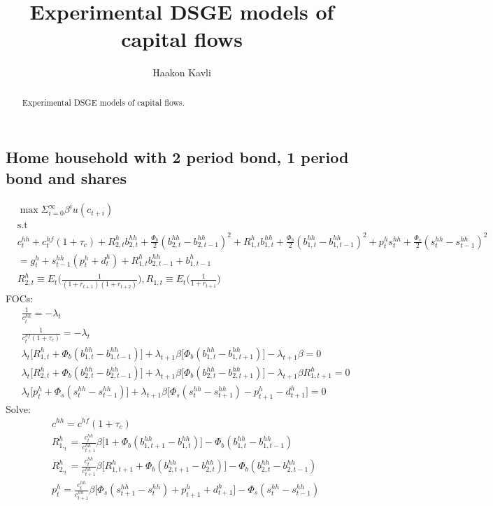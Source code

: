 \documentclass[a4paper]{article}
\begin{document}
\title{Experimental DSGE models of capital flows}
\author{Haakon Kavli}
\maketitle
\begin{abstract}
Experimental DSGE models of capital flows. 
\end{abstract}
\subsection{Home household with 2 period bond, 1 period bond and shares}
\begin{align*}
&\max \Sigma_{i=0}^\infty \beta^i u(c_{t+i})\\ &\text{s.t}\\
&c^{hh}_t+c^{hf}_t(1+\tau_c)+R^h_{2,t} b^{hh}_{2,t} + \frac{\Phi_b}{2}(b^{hh}_{2,t}-b^{hh}_{2,t-1})^2 +
R^h_{1,t} b^{hh}_{1,t} + \frac{\Phi_b}{2}(b^{hh}_{1,t}-b^{hh}_{1,t-1})^2 + p^{h}_t s^{hh}_t+\frac{\Phi_s}{2}(s^{hh}_t-s^{hh}_{t-1})^2\\
&=g^h_t+s^{hh}_{t-1}(p^{h}_t+d^{h}_t)+R^{h}_{1,t}b^{hh}_{2,t-1}+b^h_{1,t-1}\\
&R^h_{2,t} \equiv E_t\bigg(\frac{1}{(1+r_{t+1})(1+r_{t+2})} \bigg), R_{1,t} \equiv E_t\bigg(\frac{1}{1+r_{t+1}} \bigg)
\end{align*}
FOCs:
\begin{align*}
&\frac{1}{c^{hh}_t}=-\lambda_t\\
&\frac{1}{c^{hf}_t(1+\tau_c)}=-\lambda_t \\
&\lambda_t\big[R^h_{1,t}+\Phi_b (b^{hh}_{1,t}-b^{hh}_{1,t-1})\big ]+ \lambda_{t+1} \beta \big[\Phi_b (b^{hh}_{1,t} - b^{hh}_{1,t+1})]-\lambda_{t+1}\beta =0\\
&\lambda_t\big[R^h_{2,t}+\Phi_b (b^{hh}_{2,t}-b^{hh}_{2,t-1})\big ]+ \lambda_{t+1} \beta \big[\Phi_b (b^{hh}_{2,t} - b^{hh}_{2,t+1})]-\lambda_{t+1}\beta R^{h}_{1,t+1}=0\\
&\lambda_t \big[p^{h}_t + \Phi_s (s^{hh}_t-s^{hh}_{t-1})\big] + \lambda_{t+1} \beta \big[\Phi_s  (s^{hh}_t-s^{hh}_{t+1}) - p^{h}_{t+1}-d^{h}_{t+1}\big]=0
\end{align*}
Solve:
\begin{align}
&c^{hh}=c^{hf}(1+\tau_c)\\
&R^h_{1,_t}=\frac{c^{hh}_t}{c^{hh}_{t+1}}\beta \big[1+\Phi_b (b^{hh}_{1,t+1} - b^{hh}_{1,t})\big] -\Phi_b (b^{hh}_{1,t}-b^{hh}_{1,t-1})\\
&R^h_{2,_t}=\frac{c^{hh}_t}{c^{hh}_{t+1}}\beta \big[R^{h}_{1,t+1}+\Phi_b (b^{hh}_{2,t+1} - b^{hh}_{2,t})\big] -\Phi_b (b^{hh}_{2,t}-b^{hh}_{2,t-1})\\
&p^{h}_t=\frac{c^{hh}_t}{c^{hh}_{t+1}}\beta \bigg[ \Phi_s (s^{hh}_{t+1}-s^{hh}_t)+p^{h}_{t+1}+d^{h}_{t+1} \bigg] - \Phi_s (s^{hh}_t - s^{hh}_{t-1})
\end{align}
\end{document}
